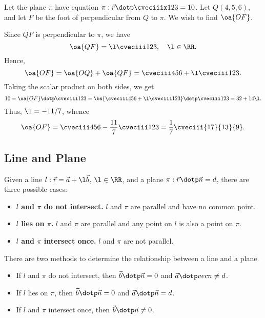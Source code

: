 \begin{example}
    Let the plane $\pi$ have equation $\pi : \vec r \dotp \cveciiix123 = 10$. Let $Q(4, 5, 6)$, and let $F$ be the foot of perpendicular from $Q$ to $\pi$. We wish to find $\oa{OF}$.

    Since $QF$ is perpendicular to $\pi$, we have \[\oa{QF} = \l \cveciii123, \quad \l \in \RR.\] Hence, \[\oa{OF} = \oa{OQ} + \oa{QF} = \cveciii456 + \l\cveciii123.\] Taking the scalar product on both sides, we get \[10 = \oa{OF} \dotp \cveciii123 = \bs{\cveciii456 + \l\cveciii123} \dotp \cveciii123 = 32 + 14\l.\] Thus, $\l = -11/7$, whence \[\oa{OF} = \cveciii456 - \frac{11}{7}\cveciii123 = \frac17 \cveciii{17}{13}{9}.\]
\end{example}

\subsection{Line and Plane}

\begin{fact}
    Given a line $l : \vec r = \vec a + \l \vec b$, $\l \in \RR$, and a plane $\pi : \vec r \dotp \vec n = d$, there are three possible cases:
    \begin{itemize}
        \item \textbf{$l$ and $\pi$ do not intersect.} $l$ and $\pi$ are parallel and have no common point.
        \item \textbf{$l$ lies on $\pi$.} $l$ and $\pi$ are parallel and any point on $l$ is also a point on $\pi$.
        \item \textbf{$l$ and $\pi$ intersect once.} $l$ and $\pi$ are not parallel.
    \end{itemize}
\end{fact}

There are two methods to determine the relationship between a line and a plane.

\begin{recipe}
    \phantom{.}
    \begin{itemize}
        \item If $l$ and $\pi$ do not intersect, then $\vec b \dotp \vec n = 0$ and $\vec a \dotp vec n \neq d$.
        \item If $l$ lies on $\pi$, then $\vec b \dotp \vec n = 0$ and $\vec a \dotp \vec n =  d$.
        \item If $l$ and $\pi$ intersect once, then $\vec b \dotp \vec n \neq 0$.
    \end{itemize}
\end{recipe}


